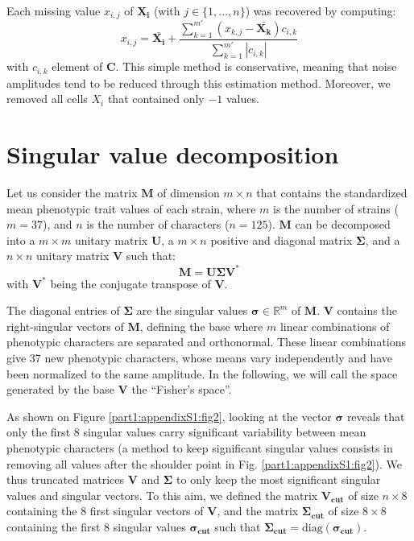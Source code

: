 Each missing value $x_{i,j}$ of $\boldsymbol{X_i}$ (with $j \in \{1,...,n\}$) was recovered by computing:
\begin{equation}
x_{i,j} = \bar{\boldsymbol{X_i}}+ \dfrac{\sum\limits_{k=1}^{m'} (x_{k,j}-\bar{\boldsymbol{X_k}})c_{i,k}}{\sum\limits_{k=1}^{m'} |c_{i,k}|}
\end{equation}
with $c_{i,k}$ element of $\boldsymbol{C}$. This simple method is conservative, meaning that noise amplitudes tend to be reduced through this estimation method.
Moreover, we removed all cells $X_i$ that contained only $-1$ values.


\section*{Singular value decomposition}
Let us consider the matrix $\boldsymbol{M}$ of dimension $m \times n$ that contains the standardized mean phenotypic trait values of each strain, where $m$ is the number of strains ($m=37$), and $n$ is the number of characters ($n=125$).
$\boldsymbol{M}$ can be decomposed into a $m \times m$ unitary matrix $\boldsymbol{U}$, a $m \times n$ positive and diagonal matrix $\boldsymbol{\Sigma}$, and a $n \times n$ unitary matrix $\boldsymbol{V}$ such that:
\begin{equation}
\boldsymbol{M} = \boldsymbol{U} \boldsymbol{\Sigma} \boldsymbol{V}^*
\label{eq:part1:sigmaFGM:SVD}
\end{equation}
with $\boldsymbol{V}^*$ being the conjugate transpose of $\boldsymbol{V}$.

The diagonal entries of $\boldsymbol{\Sigma}$ are the singular values $\boldsymbol{\sigma} \in \mathbb{R}^m$ of $\boldsymbol{M}$. $\boldsymbol{V}$ contains the right-singular vectors of $\boldsymbol{M}$, defining the base where $m$ linear combinations of phenotypic characters are separated and orthonormal. These linear combinations give 37 new phenotypic characters, whose means vary independently and have been normalized to the same amplitude. In the following, we will call the space generated by the base $\boldsymbol{V}$ the ``Fisher's space''.

As shown on Figure \ref{part1:appendixS1:fig2}, looking at the vector $\boldsymbol{\sigma}$ reveals that only the first 8 singular values carry significant variability between mean phenotypic characters (a method to keep significant singular values consists in removing all values after the shoulder point in Fig. \ref{part1:appendixS1:fig2}). We thus truncated matrices $\boldsymbol{V}$ and $\boldsymbol{\Sigma}$ to only keep the most significant singular values and singular vectors.
To this aim, we defined the matrix $\boldsymbol{V_{cut}}$ of size $n \times 8$ containing the 8 first singular vectors of $\boldsymbol{V}$, and the matrix $\boldsymbol{\Sigma_{cut}}$ of size $8 \times 8$ containing the first 8 singular values $\boldsymbol{\sigma_{cut}}$ such that $\boldsymbol{\Sigma_{cut}} = \mathrm{diag}(\boldsymbol{\sigma_{cut}})$.

